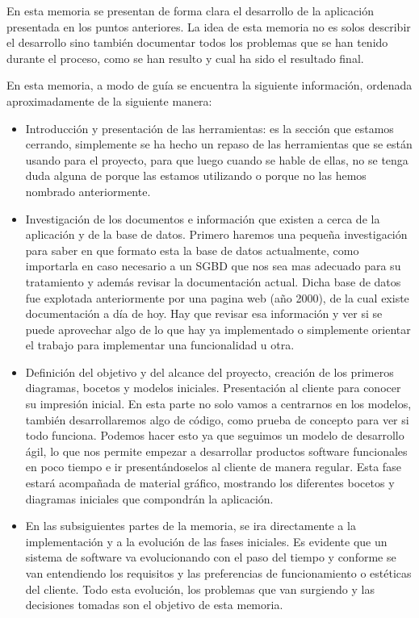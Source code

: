 En esta memoria se presentan de forma clara el desarrollo de la aplicación presentada en los puntos anteriores. La idea de esta memoria no es solos describir el desarrollo sino también documentar todos los problemas que se han tenido durante el proceso, como se han resulto y cual ha sido el resultado final.

En esta memoria, a modo de guía se encuentra la siguiente información, ordenada aproximadamente de la siguiente manera:
\begin{itemize}
    \item Introducción y presentación de las herramientas: es la sección que estamos cerrando, simplemente se ha hecho un repaso de las herramientas que se están usando para el proyecto, para que luego cuando se hable de ellas, no se tenga duda alguna de porque las estamos utilizando o porque no las hemos nombrado anteriormente. 
    
    \item Investigación de los documentos e información que existen a cerca de la aplicación y de la base de datos. Primero haremos una pequeña investigación para saber en que formato esta la base de datos actualmente, como importarla en caso necesario a un SGBD que nos sea mas adecuado para su tratamiento y además revisar la documentación actual. Dicha base de datos fue explotada anteriormente por una pagina web (año 2000), de la cual existe documentación a día de hoy. Hay que revisar esa información y ver si se puede aprovechar algo de lo que hay ya implementado o simplemente orientar el trabajo para implementar una funcionalidad u otra. 
    
    \item Definición del objetivo y del alcance del proyecto, creación de los primeros diagramas, bocetos y modelos iniciales. Presentación al cliente para conocer su impresión inicial. En esta parte no solo vamos a centrarnos en los modelos, también desarrollaremos algo de código, como prueba de concepto para ver si todo funciona. Podemos hacer esto ya que seguimos un modelo de desarrollo ágil, lo que nos permite empezar a desarrollar productos software funcionales en poco tiempo e ir presentándoselos al cliente de manera regular. Esta fase estará acompañada de material gráfico, mostrando los diferentes bocetos y diagramas iniciales que compondrán la aplicación.
    
    \item En las subsiguientes partes de la memoria, se ira directamente a la implementación y a la evolución de las fases iniciales. Es evidente que un sistema de software va evolucionando con el paso del tiempo y conforme se van entendiendo los requisitos y las preferencias de funcionamiento o estéticas del cliente. Todo esta evolución, los problemas que van surgiendo y las decisiones tomadas son el objetivo de esta memoria. 
    

\end{itemize}
